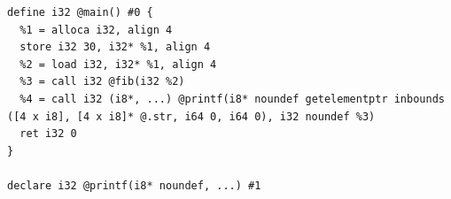 \documentclass[dvipdfmx]{jarticle}
\begin{document}
\begin{Verbatim}
define i32 @main() #0 {
  %1 = alloca i32, align 4
  store i32 30, i32* %1, align 4
  %2 = load i32, i32* %1, align 4
  %3 = call i32 @fib(i32 %2)
  %4 = call i32 (i8*, ...) @printf(i8* noundef getelementptr inbounds ([4 x i8], [4 x i8]* @.str, i64 0, i64 0), i32 noundef %3)
  ret i32 0
}

declare i32 @printf(i8* noundef, ...) #1
\end{Verbatim}
\end{document}
